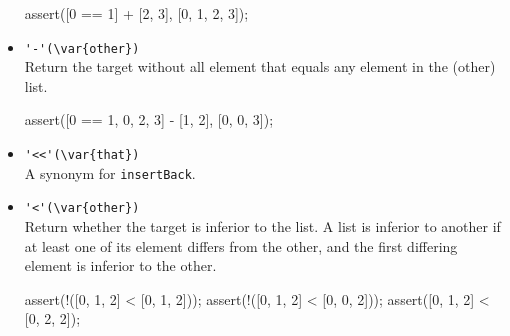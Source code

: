 \begin{itemize}
\begin{urbiscript}[firstnumber=last]
assert([0 == 1] + [2, 3], [0, 1, 2, 3]);
\end{urbiscript}

\item \lstinline|'-'(\var{other})|\\
Return the target without all element that equals any element in the
\var(other) list.

\begin{urbiscript}[firstnumber=last]
assert([0 == 1, 0, 2, 3] - [1, 2], [0, 0, 3]);
\end{urbiscript}

\item \lstinline|'<<'(\var{that})|\\
  A synonym for \lstinline|insertBack|.

\item \lstinline|'<'(\var{other})|\\
  Return whether the target is inferior to the  list. A
  list is inferior to another if at least one of its element differs
  from the other, and the first differing element is inferior to the
  other.

\begin{urbiscript}[firstnumber=last]
assert(!([0, 1, 2] < [0, 1, 2]));
assert(!([0, 1, 2] < [0, 0, 2]));
assert([0, 1, 2] < [0, 2, 2]);
\end{urbiscript}

\end{itemize}


